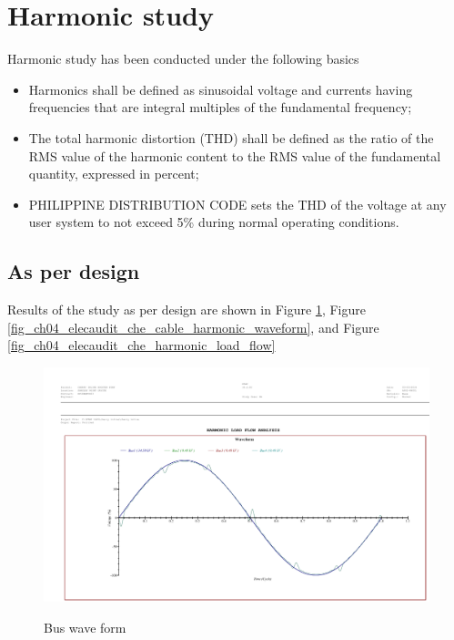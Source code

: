 %
\section{Harmonic study} \label{ch04_elecaudit_harmonicstudy}
Harmonic study has been conducted under the following basics
\begin{itemize}
\item Harmonics shall be defined as sinusoidal voltage and currents having frequencies that are integral multiples of the fundamental frequency;

\item The total harmonic distortion (THD) shall be defined as the ratio of the RMS value of the harmonic content to the RMS value of the fundamental quantity, expressed in percent;

\item PHILIPPINE DISTRIBUTION CODE sets the THD of the voltage at any user 	system to not exceed 5\% during normal operating conditions.
\end{itemize}

\subsection{As per design}
Results of the study as per design are shown in Figure \ref{fig_ch04_elecaudit_che_bus_harmonic_waveform}, Figure \ref{fig_ch04_elecaudit_che_cable_harmonic_waveform}, and Figure \ref{fig_ch04_elecaudit_che_harmonic_load_flow}


\begin{figure}[!htb]
	\includegraphics[width=\textwidth]{figures/che_bus_harmonic_waveform.pdf} \\
	\caption{Bus wave form}
	\label{fig_ch04_elecaudit_che_bus_harmonic_waveform} 
\end{figure}


